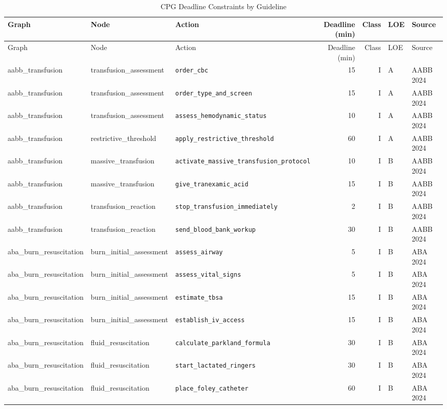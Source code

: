 \begin{longtable}{lllrrll}
\caption{CPG Deadline Constraints by Guideline}
\label{tab:deadline_derivation} \\
\toprule
Graph & Node & Action & Deadline (min) & Class & LOE & Source \\
\midrule
\endfirsthead
\toprule
Graph & Node & Action & Deadline (min) & Class & LOE & Source \\
\midrule
\endhead
\bottomrule
\endfoot
aabb\_transfusion & transfusion\_assessment & \texttt{order\_cbc} & 15 & I & A & AABB 2024 \\
aabb\_transfusion & transfusion\_assessment & \texttt{order\_type\_and\_screen} & 15 & I & A & AABB 2024 \\
aabb\_transfusion & transfusion\_assessment & \texttt{assess\_hemodynamic\_status} & 10 & I & A & AABB 2024 \\
aabb\_transfusion & restrictive\_threshold & \texttt{apply\_restrictive\_threshold} & 60 & I & A & AABB 2024 \\
aabb\_transfusion & massive\_transfusion & \texttt{activate\_massive\_transfusion\_protocol} & 10 & I & B & AABB 2024 \\
aabb\_transfusion & massive\_transfusion & \texttt{give\_tranexamic\_acid} & 15 & I & B & AABB 2024 \\
aabb\_transfusion & transfusion\_reaction & \texttt{stop\_transfusion\_immediately} & 2 & I & B & AABB 2024 \\
aabb\_transfusion & transfusion\_reaction & \texttt{send\_blood\_bank\_workup} & 30 & I & B & AABB 2024 \\
aba\_burn\_resuscitation & burn\_initial\_assessment & \texttt{assess\_airway} & 5 & I & B & ABA 2024 \\
aba\_burn\_resuscitation & burn\_initial\_assessment & \texttt{assess\_vital\_signs} & 5 & I & B & ABA 2024 \\
aba\_burn\_resuscitation & burn\_initial\_assessment & \texttt{estimate\_tbsa} & 15 & I & B & ABA 2024 \\
aba\_burn\_resuscitation & burn\_initial\_assessment & \texttt{establish\_iv\_access} & 15 & I & B & ABA 2024 \\
aba\_burn\_resuscitation & fluid\_resuscitation & \texttt{calculate\_parkland\_formula} & 30 & I & B & ABA 2024 \\
aba\_burn\_resuscitation & fluid\_resuscitation & \texttt{start\_lactated\_ringers} & 30 & I & B & ABA 2024 \\
aba\_burn\_resuscitation & fluid\_resuscitation & \texttt{place\_foley\_catheter} & 60 & I & B & ABA 2024 \\

\end{longtable}
